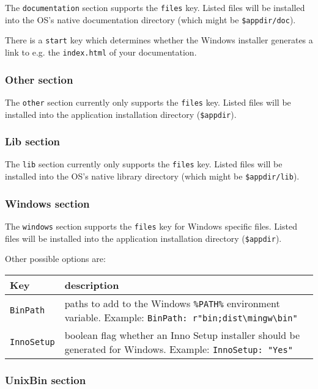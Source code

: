The \texttt{documentation} section supports the \texttt{files} key.
Listed files will be installed into the OS's native documentation
directory (which might be \texttt{\$appdir/doc}).

There is a \texttt{start} key which determines whether the Windows
installer generates a link to e.g. the \texttt{index.html} of your
documentation.

\hypertarget{other-section}{%
\subsubsection{Other section}\label{other-section}}

The \texttt{other} section currently only supports the \texttt{files}
key. Listed files will be installed into the application installation
directory (\texttt{\$appdir}).

\hypertarget{lib-section}{%
\subsubsection{Lib section}\label{lib-section}}

The \texttt{lib} section currently only supports the \texttt{files} key.
Listed files will be installed into the OS's native library directory
(which might be \texttt{\$appdir/lib}).

\hypertarget{windows-section}{%
\subsubsection{Windows section}\label{windows-section}}

The \texttt{windows} section supports the \texttt{files} key for Windows
specific files. Listed files will be installed into the application
installation directory (\texttt{\$appdir}).

Other possible options are:

\begin{longtable}[]{@{}ll@{}}
\toprule
Key & description\tabularnewline
\midrule
\endhead
\texttt{BinPath} & paths to add to the Windows \texttt{\%PATH\%}
environment variable. Example:
\texttt{BinPath:\ r"bin;dist\textbackslash{}mingw\textbackslash{}bin"}\tabularnewline
\texttt{InnoSetup} & boolean flag whether an Inno Setup installer should
be generated for Windows. Example:
\texttt{InnoSetup:\ "Yes"}\tabularnewline
\bottomrule
\end{longtable}

\hypertarget{unixbin-section}{%
\subsubsection{UnixBin section}\label{unixbin-section}}

